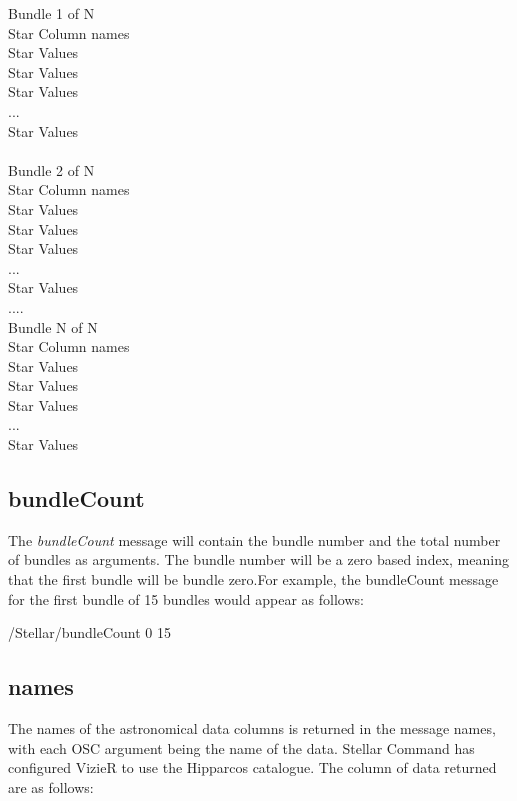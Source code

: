 \begin{syntax}
	Bundle 1 of N\\
	Star Column names\\
	Star Values \\
	Star Values \\
	Star Values \\
	...\\
	Star Values \\
	\\
	Bundle 2 of N\\
	Star Column names\\
	Star Values \\
	Star Values \\
	Star Values \\
	...\\
	Star Values \\
	
	....\\
	Bundle N of N\\
	Star Column names\\
	Star Values \\
	Star Values \\
	Star Values \\
	...\\
	Star Values \\
	
\end{syntax}

\subsection{bundleCount}
The \textit{bundleCount} message will contain the bundle number and the total number of bundles as arguments. The bundle number will be a zero based index, meaning that the first bundle will be bundle zero.For example, the bundleCount message for the first bundle of 15 bundles would appear as follows:

\begin{syntax}
	/Stellar/bundleCount 0 15
\end{syntax}
\bigskip

\subsection{names}
The names of the astronomical data columns is returned in the message names, with each OSC argument being the name of the  data. Stellar Command has configured VizieR to use the Hipparcos catalogue. The column of data returned are as follows: 

